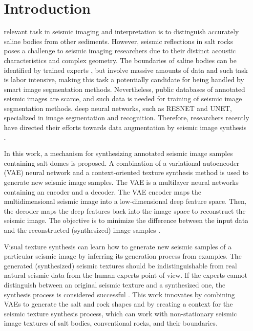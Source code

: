\documentclass{ieeeaccess}
\begin{document}
\section{Introduction}
\label{sec:introduction}
 relevant task in seismic imaging and interpretation is to distinguish accurately saline bodies from other sediments. However, seismic reflections in salt rocks poses a challenge to seismic imaging researchers due to their distinct acoustic characteristics and complex geometry.  The boundaries of saline bodies can be identified by trained experts \cite{ref5}, but involve massive amounts of data and such task is labor intensive, making this task a potentially candidate for being handled by smart image segmentation methods. Nevertheless, public databases of annotated seismic images are scarce, and such data is needed for training of seismic image segmentation methods. deep neural networks, such as RESNET and UNET, specialized in image segmentation and recognition. Therefore, researchers recently have directed their efforts towards data augmentation by seismic image synthesis \cite{ref1}.

In this work, a mechanism for synthesizing annotated seismic image samples containing salt domes is proposed. A combination of a variational autoencoder (VAE) neural network and a context-oriented texture synthesis method is used to generate new seismic image samples. The VAE is a  multilayer neural networks containing an encoder and a decoder. The VAE encoder maps the multidimensional seismic image into a low-dimensional deep feature space. Then, the decoder maps the deep features back into the image space to reconstruct the seismic image. The objective is to minimize the difference between the input data and the reconstructed (synthesized) image samples \cite{ref3}.

Visual texture synthesis can learn how to generate new seismic samples of a particular seismic image by inferring its generation process from examples. The generated (synthesized) seismic textures should be indistinguishable from real natural seismic data from the human experts point of view. If the experts cannot distinguish between an original seismic texture and a synthesized one, the synthesis process is considered successful \cite{ref4}. This work innovates by combining VAEs to generate the salt and rock shapes and by creating a context for the seismic texture synthesis process, which can work with non-stationary seismic image textures of salt bodies, conventional rocks, and their boundaries. 
\end{document}
